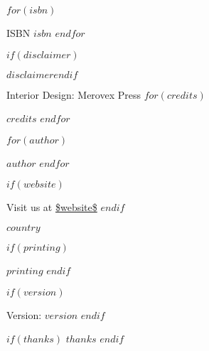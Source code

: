   $for(isbn)$
    \par\noindent ISBN $isbn$
  $endfor$\newline

  \footnotesize
  $if(disclaimer)$\par\noindent $disclaimer$\newline$endif$

  \par\noindent Interior Design: Merovex Press %
  $for(credits)$
    \par\noindent $credits$
  $endfor$\newline

  \par\noindent $for(author)$
      \par\noindent $author$
    $endfor$\newline

  $if(website)$
    \par\noindent Visit us at \url{$website$}\newline
  $endif$

  \par\noindent $country$
  \newline

  $if(printing)$
    \par\noindent\textit{$printing$}
    \newline
  $endif$

  $if(version)$
  \par\noindent Version: $version$
  $endif$
  \vspace*{\fill}
  \clearpage\normalsize

  $if(thanks)$
    $thanks$
    \newpage
  $endif$
